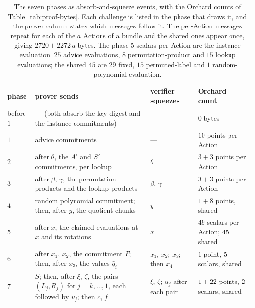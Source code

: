 \documentclass[11pt,a4paper]{article}
\theoremstyle{definition}
\begin{document}
\begin{table}[htbp]
\centering
\footnotesize
\begin{tabular}{@{}l p{5.4cm} p{3.0cm} p{3.2cm}@{}}
\toprule
phase & prover sends & verifier squeezes & Orchard count \\
\midrule
before $1$ & --- (both absorb the key digest and the instance
  commitments) & --- & $0$ bytes \\
$1$ & advice commitments & --- & $10$ points per Action \\
$2$ & after $\theta$, the $A'$ and $S'$ commitments, per lookup
  & $\theta$ & $3 + 3$ points per Action \\
$3$ & after $\beta$, $\gamma$, the permutation products and the lookup
  products & $\beta$, $\gamma$ & $3 + 3$ points per Action \\
$4$ & random polynomial commitment; then, after $y$, the quotient chunks
  & $y$ & $1 + 8$ points, shared \\
$5$ & after $x$, the claimed evaluations at $x$ and its rotations & $x$
  & $49$ scalars per Action; $45$ shared \\
$6$ & after $x_1$, $x_2$, the commitment $F$; then, after $x_3$, the
  values $\bar q_i$ & $x_1$, $x_2$; $x_3$; then $x_4$
  & $1$ point, $5$ scalars, shared \\
$7$ & $S$; then, after $\xi$, $\zeta$, the pairs $(L_j, R_j)$ for
  $j = k, \dots, 1$, each followed by $u_j$; then $c$, $f$
  & $\xi$, $\zeta$; $u_j$ after each pair
  & $1 + 22$ points, $2$ scalars, shared \\
\bottomrule
\end{tabular}
\caption{The seven phases as absorb-and-squeeze events, with the Orchard
counts of Table~\ref{tab:proof-bytes}. Each challenge is listed in the
phase that draws it, and the prover column states which messages follow
it. The per-Action messages repeat for each of the $a$ Actions of a
bundle and the shared ones appear once, giving $2720 + 2272\,a$ bytes.
The phase-5 scalars per Action are the instance evaluation, $25$ advice
evaluations, $8$ permutation-product and $15$ lookup evaluations; the
shared $45$ are $29$ fixed, $15$ permuted-label and $1$
random-polynomial evaluation.}
\label{tab:halo2-phases}
\end{table}
\end{document}
